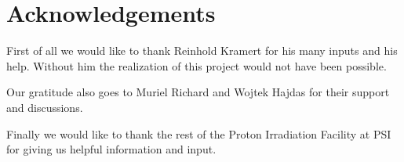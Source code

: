 \section*{Acknowledgements}
\label{sec:acknowledgements}
First of all we would like to thank Reinhold Kramert for his many inputs and his help.
Without him the realization of this project would not have been possible.

Our gratitude also goes to Muriel Richard and Wojtek Hajdas for their support and discussions.

Finally we would like to thank the rest of the Proton Irradiation Facility at PSI for giving us helpful information and input.
